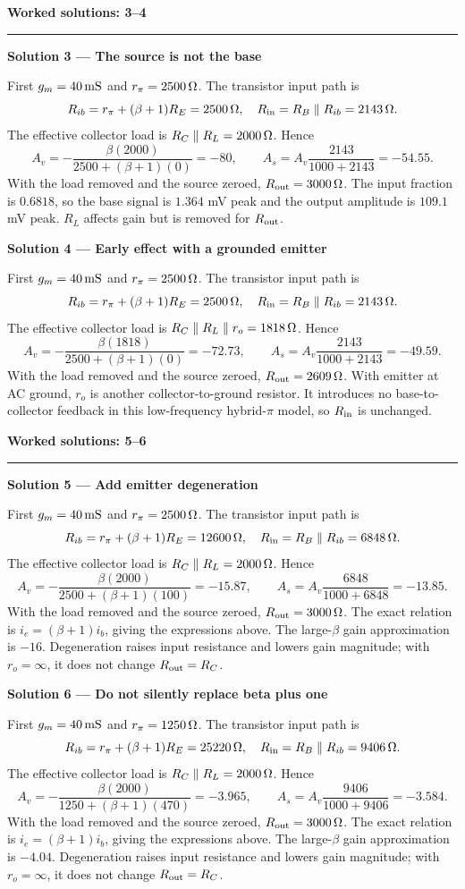 \documentclass[11pt,a4paper]{article}
\newcommand{\head}[1]{\par{\Large\bfseries\color{ink}#1}\par\vspace{3pt}\hrule\vspace{7pt}}
\newcommand{\sol}[2]{\par{\large\bfseries\color{ink}Solution #1 --- #2}\label{sol:#1}\par}
\begin{document}
\newpage
\head{Worked solutions: 3--4}
\sol{3}{The source is not the base}First $g_m=40\,\mathrm{mS}$ and $r_\pi=2500\,\Omega$. The transistor input path is
\[R_{ib}=r_\pi+(\beta+1)R_E=2500\,\Omega,\quad R_{\rm in}=R_B\parallel R_{ib}=2143\,\Omega.\]
The effective collector load is $R_C\parallel R_L=2000\,\Omega$. Hence
\[A_v=-\frac{\beta(2000)}{2500+(\beta+1)(0)}=-80,\qquad
A_s=A_v\frac{2143}{1000+2143}=-54.55.\]
With the load removed and the source zeroed, $R_{\rm out}=3000\,\Omega$. The input fraction is $0.6818$, so the base signal is $1.364$ mV peak and the output amplitude is $109.1$ mV peak. $R_L$ affects gain but is removed for $R_{\rm out}$.\par\vfill
\sol{4}{Early effect with a grounded emitter}First $g_m=40\,\mathrm{mS}$ and $r_\pi=2500\,\Omega$. The transistor input path is
\[R_{ib}=r_\pi+(\beta+1)R_E=2500\,\Omega,\quad R_{\rm in}=R_B\parallel R_{ib}=2143\,\Omega.\]
The effective collector load is $R_C\parallel R_L\parallel r_o=1818\,\Omega$. Hence
\[A_v=-\frac{\beta(1818)}{2500+(\beta+1)(0)}=-72.73,\qquad
A_s=A_v\frac{2143}{1000+2143}=-49.59.\]
With the load removed and the source zeroed, $R_{\rm out}=2609\,\Omega$. With emitter at AC ground, $r_o$ is another collector-to-ground resistor. It introduces no base-to-collector feedback in this low-frequency hybrid-$\pi$ model, so $R_{\rm in}$ is unchanged.\par\vfill

\newpage
\head{Worked solutions: 5--6}
\sol{5}{Add emitter degeneration}First $g_m=40\,\mathrm{mS}$ and $r_\pi=2500\,\Omega$. The transistor input path is
\[R_{ib}=r_\pi+(\beta+1)R_E=12600\,\Omega,\quad R_{\rm in}=R_B\parallel R_{ib}=6848\,\Omega.\]
The effective collector load is $R_C\parallel R_L=2000\,\Omega$. Hence
\[A_v=-\frac{\beta(2000)}{2500+(\beta+1)(100)}=-15.87,\qquad
A_s=A_v\frac{6848}{1000+6848}=-13.85.\]
With the load removed and the source zeroed, $R_{\rm out}=3000\,\Omega$. The exact relation is $i_e=(\beta+1)i_b$, giving the expressions above. The large-$\beta$ gain approximation is $-16$. Degeneration raises input resistance and lowers gain magnitude; with $r_o=\infty$, it does not change $R_{\rm out}=R_C$.\par\vfill
\sol{6}{Do not silently replace beta plus one}First $g_m=40\,\mathrm{mS}$ and $r_\pi=1250\,\Omega$. The transistor input path is
\[R_{ib}=r_\pi+(\beta+1)R_E=25220\,\Omega,\quad R_{\rm in}=R_B\parallel R_{ib}=9406\,\Omega.\]
The effective collector load is $R_C\parallel R_L=2000\,\Omega$. Hence
\[A_v=-\frac{\beta(2000)}{1250+(\beta+1)(470)}=-3.965,\qquad
A_s=A_v\frac{9406}{1000+9406}=-3.584.\]
With the load removed and the source zeroed, $R_{\rm out}=3000\,\Omega$. The exact relation is $i_e=(\beta+1)i_b$, giving the expressions above. The large-$\beta$ gain approximation is $-4.04$. Degeneration raises input resistance and lowers gain magnitude; with $r_o=\infty$, it does not change $R_{\rm out}=R_C$.\par\vfill
\end{document}
